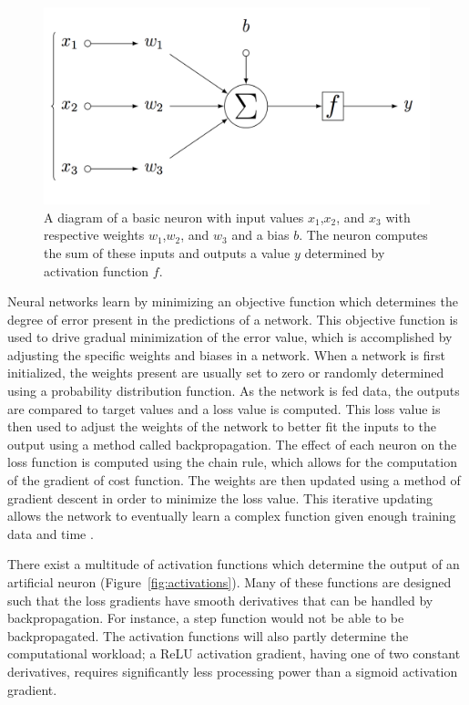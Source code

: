 \documentclass[12pt,oneside,onecolumn,a4paper]{article}
\begin{document}
\begin{figure}[H]
\begin{center}
\includegraphics[width=0.8\columnwidth]{figures/neuron}
\caption{A diagram of a basic neuron with input values $x_{1}$,$x_{2}$, and $x_{3}$ with respective weights $w_{1}$,$w_{2}$, and $w_{3}$ and a bias $b$. The neuron computes the sum of these inputs and outputs a value $y$ determined by activation function $f$. \label{fig:neuron}}
\end{center}
\end{figure}

Neural networks learn by minimizing an objective function which determines the degree of error present in the predictions of a network. This objective function is used to drive gradual minimization of the error value, which is accomplished by adjusting the specific weights and biases in a network. When a network is first initialized, the weights present are usually set to zero or randomly determined using a probability distribution function. As the network is fed data, the outputs are compared to target values and a loss value is computed. This loss value is then used to adjust the weights of the network to better fit the inputs to the output using a method called backpropagation. The effect of each neuron on the loss function is computed using the chain rule, which allows for the computation of the gradient of cost function. The weights are then updated using a method of gradient descent in order to minimize the loss value. This iterative updating allows the network to eventually learn a complex function given enough training data and time \citep{Zilouchian2001FundamentalsON}. 

There exist a multitude of activation functions which determine the output of an artificial neuron (Figure~\ref{fig:activations}). Many of these functions are designed such that the loss gradients have smooth derivatives that can be handled by backpropagation. For instance, a step function would not be able to be backpropagated. The activation functions will also partly determine the computational workload; a ReLU activation gradient, having one of two constant derivatives, requires significantly less processing power than a sigmoid activation gradient.
\end{document}
